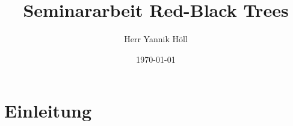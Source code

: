 \documentclass[11pt]{article}
\title{\textbf{Seminararbeit Red-Black Trees}}
\author{Herr Yannik Höll}
\date{\today}
\begin{document}
\begin{titlingpage}
    \maketitle
\end{titlingpage}
\pagebreak

\tableofcontents
\pagebreak

\glsaddall
\printglossary 
\pagebreak

\section{Einleitung}



\end{document}
